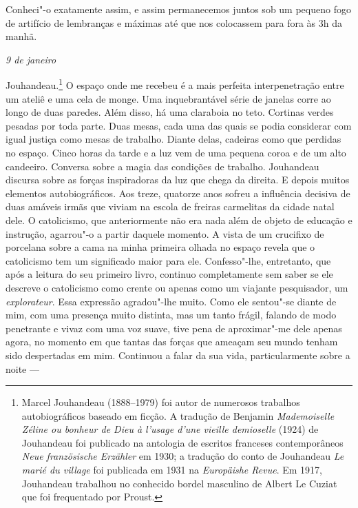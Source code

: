 Conheci"-o exatamente assim, e assim permanecemos juntos sob um pequeno
fogo de artifício de lembranças e máximas até que nos colocassem para
fora às 3h da manhã.

\begin{flushright}
\emph{9 de janeiro}
\end{flushright}

Jouhandeau.\footnote{Marcel Jouhandeau
  (1888--1979) foi autor de numerosos trabalhos autobiográficos baseado
  em ficção. A tradução de Benjamin \emph{Mademoiselle Zéline ou bonheur
  de Dieu à l'usage d'une vieille demioselle} (1924) de Jouhandeau foi
  publicado na antologia de escritos franceses contemporâneos
  \emph{Neue französische Erzähler} em 1930; a tradução do conto de
  Jouhandeau \emph{Le marié du village} foi publicada em 1931 na
  \emph{Europäishe Revue}. Em 1917, Jouhandeau trabalhou no conhecido
  bordel masculino de Albert Le Cuziat que foi frequentado por Proust. \versal{[N.~O.]}}
O espaço onde me recebeu é a mais perfeita interpenetração entre um
ateliê e uma cela de monge. Uma inquebrantável série de janelas corre ao
longo de duas paredes. Além disso, há uma claraboia no teto. Cortinas
verdes pesadas por toda parte. Duas mesas, cada uma das quais se podia
considerar com igual justiça como mesas de trabalho. Diante delas,
cadeiras como que perdidas no espaço. Cinco horas da tarde e a luz vem
de uma pequena coroa e de um alto candeeiro. Conversa sobre a magia das
condições de trabalho. Jouhandeau discursa sobre as forças inspiradoras
da luz que chega da direita. E depois muitos elementos autobiográficos.
Aos treze, quatorze anos sofreu a influência decisiva de duas amáveis
irmãs que viviam na escola de freiras carmelitas da cidade natal dele. O
catolicismo, que anteriormente não era nada além de objeto de educação e
instrução, agarrou"-o a partir daquele momento. A vista de um crucifixo de
porcelana sobre a cama na minha primeira olhada no espaço revela que o
catolicismo tem um significado maior para ele. Confesso"-lhe, entretanto,
que após a leitura do seu primeiro livro, continuo completamente sem
saber se ele descreve o catolicismo como crente ou apenas como um
viajante pesquisador, um \emph{explorateur}. Essa expressão agradou"-lhe
muito. Como ele sentou"-se diante de mim, com uma presença muito
distinta, mas um tanto frágil, falando de modo penetrante e vivaz com
uma voz suave, tive pena de aproximar"-me dele apenas agora, no momento
em que tantas das forças que ameaçam seu mundo tenham sido despertadas
em mim. Continuou a falar da sua vida, particularmente sobre a noite ---
